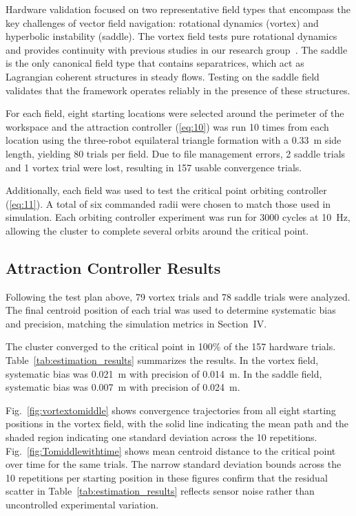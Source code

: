 \documentclass[lettersize,journal]{IEEEtran}
\begin{document}
Hardware validation focused on two representative field types that encompass the key challenges of vector field navigation: rotational dynamics (vortex) and hyperbolic instability (saddle). The vortex field tests pure rotational dynamics and provides continuity with previous studies in our research group~\cite{22,48}. The saddle is the only canonical field type that contains separatrices, which act as Lagrangian coherent structures in steady flows. Testing on 
the saddle field validates that the framework operates reliably in the presence of these structures.

For each field, eight starting locations were selected around the perimeter of the workspace and the attraction controller (\ref{eq:10}) was run 10 times from each location using the three-robot equilateral triangle formation with a 0.33~m side length, yielding 80 trials per field. Due to file management errors, 2 saddle trials and 1 vortex trial were lost, resulting in 157 usable convergence trials.

Additionally, each field was used to test the critical point orbiting controller (\ref{eq:11}). A total of six commanded radii were chosen to match those used in simulation. Each orbiting controller experiment was run for 3000 cycles at 10~Hz, allowing the cluster to complete several orbits around the critical point.

 \subsection{Attraction Controller Results}

Following the test plan above, 79 vortex trials and 78 saddle trials were analyzed. The final centroid position of each trial was used to determine systematic bias and precision, matching the simulation metrics in Section~IV.

The cluster converged to the critical point in 100\% of the 157 hardware trials. Table~\ref{tab:estimation_results} summarizes the results. In the vortex field, systematic bias was 0.021~m with precision of 0.014~m. In the saddle field, systematic bias was 0.007~m with precision of 0.024~m.

Fig.~\ref{fig:vortextomiddle} shows convergence trajectories from all eight starting positions in the vortex field, with the solid line indicating the mean path and the shaded region indicating one standard deviation across the 10 repetitions. Fig.~\ref{fig:Tomiddlewithtime} shows mean centroid distance to the critical point over time for the same trials. The narrow standard deviation bounds across the 10 repetitions per starting position in these figures confirm that the residual scatter in Table~\ref{tab:estimation_results} reflects sensor noise rather than uncontrolled experimental variation.
\end{document}
